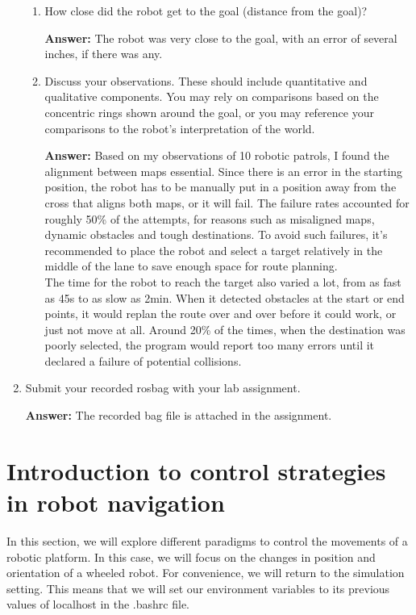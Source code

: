\documentclass[12pt]{article}
\begin{document}
\begin{enumerate}
\begin{enumerate}
        \item How close did the robot get to the goal (distance from the goal)?
        
        \textbf{Answer: }The robot was very close to the goal, with an error of several inches, if there was any.

        \item Discuss your observations. These should include quantitative and qualitative components. You may rely on comparisons based on the concentric rings shown around the goal, or you may reference your comparisons to the robot’s interpretation of the world.
    
        \textbf{Answer: }Based on my observations of 10 robotic patrols, I found the alignment between maps essential. Since there is an error in the starting position, the robot has to be manually put in a position away from the cross that aligns both maps, or it will fail. The failure rates accounted for roughly 50\% of the attempts, for reasons such as misaligned maps, dynamic obstacles and tough destinations. To avoid such failures, it's recommended to place the robot and select a target relatively in the middle of the lane to save enough space for route planning.
        \\The time for the robot to reach the target also varied a lot, from as fast as 45s to as slow as 2min. When it detected obstacles at the start or end points, it would replan the route over and over before it could work, or just not move at all. Around 20\% of the times, when the destination was poorly selected, the program would report too many errors until it declared a failure of potential collisions.

    \end{enumerate}

    \item Submit your recorded rosbag with your lab assignment.
    
    \textbf{Answer: }The recorded bag file is attached in the assignment.
    
\end{enumerate}


\section{Introduction to control strategies in robot navigation
}
In this section, we will explore different paradigms to control the movements of a robotic platform. In this case, we will focus on the changes in position and orientation of a wheeled robot. For convenience, we will return to the simulation setting.
This means that we will set our environment variables to its previous values of localhost in the .bashrc file. 
\end{document}
